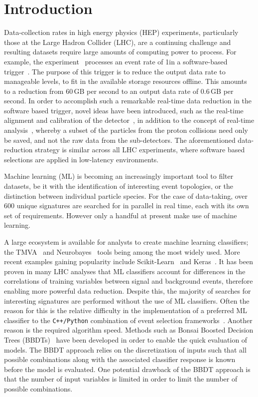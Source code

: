 \section{Introduction}
\label{sec:intro}

Data-collection rates in high energy physics (HEP) experiments, particularly those at the Large Hadron Collider (LHC),
are a continuing challenge and resulting datasets require large amounts of computing power to process.
For example, the \lhcb experiment~\cite{Alves:2008zz} processes an event rate of 1\mhz in a software-based
trigger~\cite{LHCb-DP-2014-002}. The purpose of this trigger is to reduce the output
data rate to manageable levels, \ie to fit in the available storage resources offline.
This amounts to a reduction from 60\,GB per second to an output data rate of 0.6\,GB per second.
In order to accomplish such a remarkable real-time data reduction in the software based trigger,
novel ideas have been introduced, such as the real-time alignment and calibration of the detector~\cite{Xu:2016mik},
in addition to the concept of real-time analysis~\cite{Aaij:2016rxn}, whereby a subset of the particles from the proton collisions need only
be saved, and not the raw data from the sub-detectors.
The aforementioned data-reduction strategy is similar across all LHC experiments, where
software based selections are applied in low-latency environments.

Machine learning (ML) is becoming an increasingly important tool to filter datasets,
be it with the identification of interesting event topologies, or the distinction
between individual particle species. For the case of \lhcb data-taking, over 600
unique signatures are searched for in parallel in real time, each with its own set of requirements.
However only a handful at present make use of machine learning.

A large ecosystem is available for analysts to create machine learning classifiers;
the TMVA~\cite{Hocker:2007ht} and Neurobayes~\cite{Feindt:2006pm} tools being among the most widely used.
More recent examples gaining popularity include Scikit-Learn~\cite{Pedregosa:2012toh}
and Keras~\cite{keras}. It has been proven in many LHC analyses that
ML classifiers account for differences in the correlations of
training variables between signal and background events, therefore enabling more
powerful data reduction.
Despite this, the majority of searches for interesting signatures are performed
without the use of ML classifiers. Often the reason for this is the relative difficulty in
the implementation of a preferred ML classifier to the {\tt C++/Python} combination
of event selection frameworks~\cite{Barrand:2001ny}. Another
reason is the required algorithm speed. Methods such as Bonsai
Boosted Decision Trees (BBDTs)~\cite{Gligorov:2012qt} have been developed in order
to enable the quick evaluation of models. The BBDT approach relies on the
discretization of inputs such that all possible combinations along with
the associated classifier response is known before the model is evaluated.
One potential drawback of the BBDT approach is that the number of input variables is limited
in order to limit the number of possible combinations.

